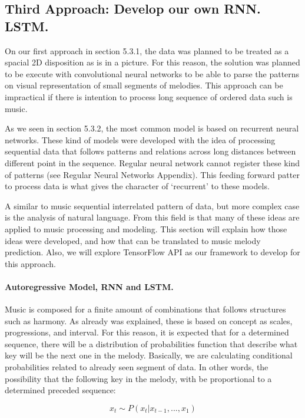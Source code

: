 \subsection{Third Approach: Develop our own RNN. LSTM.}

On our first approach in section 5.3.1, the data was planned to be treated as a spacial
2D disposition as is in a picture. For this reason, the solution was planned to be
execute with convolutional neural networks to be able to parse the patterns on visual
representation of small segments of melodies. This approach can be impractical if
there is intention to process long sequence of ordered data such is music.

As we seen in section 5.3.2, the most common model is based on recurrent neural
networks. These kind of models were developed with the idea of processing sequential
data that follows patterns and relations across long distances between different point
in the sequence. Regular neural network cannot register these kind of patterns (see
Regular Neural Networks Appendix). This feeding forward patter to process data is
what gives the character of ‘recurrent’ to these models.

A similar to music sequential interrelated pattern of data, but more complex case is the
analysis of natural language. From this field is that many of these ideas are applied to
music processing and modeling. This section will explain how those ideas were
developed, and how that can be translated to music melody prediction. Also, we will
explore TensorFlow API as our framework to develop for this approach.

\paragraph{Autoregressive Model, RNN and LSTM.} Music is composed for a finite amount of
combinations that follows structures such as harmony. As already was explained, these is
based on concept as scales, progressions, and interval. For this reason, it is expected
that for a determined sequence, there will be a distribution of probabilities function
that describe what key will be the next one in the melody. Basically, we are calculating
conditional probabilities related to already seen segment of data. In other words, the
possibility that the following key in the melody, with be proportional to a determined
preceded sequence:

\begin{equation}
  x_t \sim P \left( x_t \vert  x_{t - 1}, ..., x_1 \right)
\end{equation}

